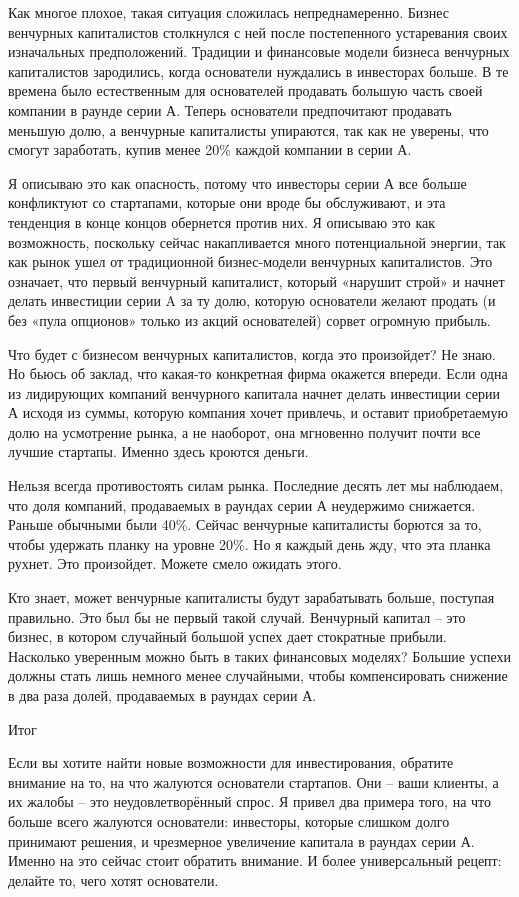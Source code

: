 \documentclass[ebook,12pt,oneside,openany]{memoir}
\begin{document}
Как многое плохое, такая ситуация сложилась непреднамеренно. Бизнес
венчурных капиталистов столкнулся с ней после постепенного устаревания
своих изначальных предположений. Традиции и финансовые модели бизнеса
венчурных капиталистов зародились, когда основатели нуждались в
инвесторах больше. В те времена было естественным для основателей
продавать большую часть своей компании в раунде серии А. Теперь
основатели предпочитают продавать меньшую долю, а венчурные
капиталисты упираются, так как не уверены, что смогут заработать,
купив менее 20\% каждой компании в серии А.

Я описываю это как опасность, потому что инвесторы серии А все больше
конфликтуют со стартапами, которые они вроде бы обслуживают, и эта
тенденция в конце концов обернется против них. Я описываю это как
возможность, поскольку сейчас накапливается много потенциальной
энергии, так как рынок ушел от традиционной бизнес-модели венчурных
капиталистов. Это означает, что первый венчурный капиталист, который
«нарушит строй» и начнет делать инвестиции серии A за ту долю, которую
основатели желают продать (и без «пула опционов» только из акций
основателей) сорвет огромную прибыль.

Что будет с бизнесом венчурных капиталистов, когда это произойдет? Не
знаю. Но бьюсь об заклад, что какая-то конкретная фирма окажется
впереди. Если одна из лидирующих компаний венчурного капитала начнет
делать инвестиции серии А исходя из суммы, которую компания хочет
привлечь, и оставит приобретаемую долю на усмотрение рынка, а не
наоборот, она мгновенно получит почти все лучшие стартапы. Именно
здесь кроются деньги.

Нельзя всегда противостоять силам рынка. Последние десять лет мы
наблюдаем, что доля компаний, продаваемых в раундах серии А неудержимо
снижается. Раньше обычными были 40\%. Сейчас венчурные капиталисты
борются за то, чтобы удержать планку на уровне 20\%. Но я каждый день
жду, что эта планка рухнет. Это произойдет. Можете смело ожидать
этого.

Кто знает, может венчурные капиталисты будут зарабатывать больше,
поступая правильно. Это был бы не первый такой случай. Венчурный
капитал – это бизнес, в котором случайный большой успех дает
стократные прибыли. Насколько уверенным можно быть в таких финансовых
моделях? Большие успехи должны стать лишь немного менее случайными,
чтобы компенсировать снижение в два раза долей, продаваемых в раундах
серии А.

Итог

Если вы хотите найти новые возможности для инвестирования, обратите
внимание на то, на что жалуются основатели стартапов. Они – ваши
клиенты, а их жалобы – это неудовлетворённый спрос. Я привел два
примера того, на что больше всего жалуются основатели: инвесторы,
которые слишком долго принимают решения, и чрезмерное увеличение
капитала в раундах серии А. Именно на это сейчас стоит обратить
внимание. И более универсальный рецепт: делайте то, чего хотят
основатели.
\end{document}
